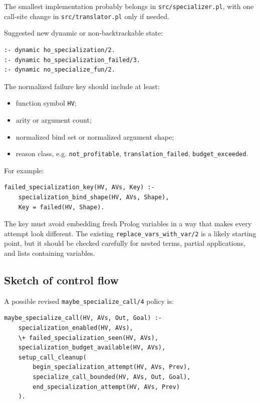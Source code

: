 \documentclass[11pt]{article}
\begin{document}
The smallest implementation probably belongs in \texttt{src/specializer.pl}, with one call-site change in \texttt{src/translator.pl} only if needed.

Suggested new dynamic or non-backtrackable state:

\begin{lstlisting}
:- dynamic ho_specialization/2.
:- dynamic ho_specialization_failed/3.
:- dynamic no_specialize_fun/2.
\end{lstlisting}

The normalized failure key should include at least:

\begin{itemize}[nosep]
\item function symbol \texttt{HV};
\item arity or argument count;
\item normalized bind set or normalized argument shape;
\item reason class, e.g. \texttt{not_profitable}, \texttt{translation_failed}, \texttt{budget_exceeded}.
\end{itemize}

For example:

\begin{lstlisting}
failed_specialization_key(HV, AVs, Key) :-
    specialization_bind_shape(HV, AVs, Shape),
    Key = failed(HV, Shape).
\end{lstlisting}

The key must avoid embedding fresh Prolog variables in a way that makes every attempt look different. The existing \texttt{replace\_vars\_with\_var/2} is a likely starting point, but it should be checked carefully for nested terms, partial applications, and lists containing variables.

\subsection{Sketch of control flow}

A possible revised \texttt{maybe\_specialize\_call/4} policy is:

\begin{lstlisting}
maybe_specialize_call(HV, AVs, Out, Goal) :-
    specialization_enabled(HV, AVs),
    \+ failed_specialization_seen(HV, AVs),
    specialization_budget_available(HV, AVs),
    setup_call_cleanup(
        begin_specialization_attempt(HV, AVs, Prev),
        specialize_call_bounded(HV, AVs, Out, Goal),
        end_specialization_attempt(HV, AVs, Prev)
    ).
\end{lstlisting}
\end{document}
